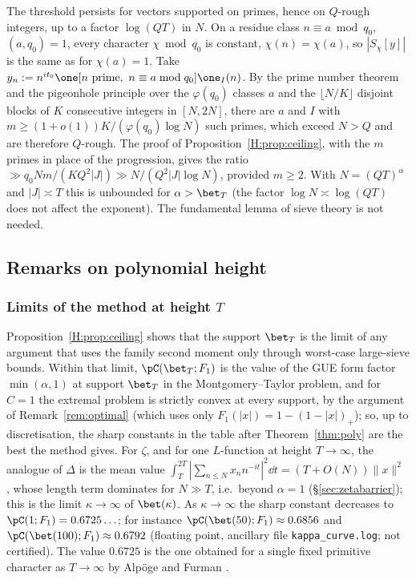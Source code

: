 \begin{remark}\label{H:rem:ceilingprimes}
The threshold persists for vectors supported on primes, hence on $Q$-rough integers, up to a factor $\log(QT)$ in $N$. On a residue class $n\equiv a\bmod q_0$, $(a,q_0)=1$, every character $\chi\bmod q_0$ is constant, $\chi(n)=\chi(a)$, so $|S_\chi[y]|$ is the same as for $\chi(a)=1$. Take $y_n:=n^{it_0}\one[n\text{ prime},\ n\equiv a\bmod q_0]\one_I(n)$. By the prime number theorem and the pigeonhole principle over the $\varphi(q_0)$ classes $a$ and the $\lfloor N/K\rfloor$ disjoint blocks of $K$ consecutive integers in $[N,2N]$, there are $a$ and $I$ with $m\ge(1+o(1))K/(\varphi(q_0)\log N)$ such primes, which exceed $N>Q$ and are therefore $Q$-rough. The proof of Proposition~\ref{H:prop:ceiling}, with the $m$ primes in place of the progression, gives the ratio $\gg q_0Nm/(KQ^2|J|)\gg N/(Q^2|J|\log N)$, provided $m\ge2$. With $N=(QT)^\alpha$ and $|J|\asymp T$ this is unbounded for $\alpha>\bet_T$ (the factor $\log N\asymp\log(QT)$ does not affect the exponent). The fundamental lemma of sieve theory is not needed.
\end{remark}

\subsection{Remarks on polynomial height}\label{H:sec:remarks}

\subsubsection*{Limits of the method at height $T$}
Proposition~\ref{H:prop:ceiling} shows that the support $\bet_T$ is the limit of any argument that uses the family second moment only through worst-case large-sieve bounds. Within that limit, $\pC(\bet_T;F_1)$ is the value of the GUE form factor $\min(\alpha,1)$ at support $\bet_T$ in the Montgomery--Taylor problem, and for $C=1$ the extremal problem is strictly convex at every support, by the argument of Remark~\ref{rem:optimal} (which uses only $F_1(|x|)=1-(1-|x|)_+$); so, up to discretisation, the sharp constants in the table after Theorem~\ref{thm:poly} are the best the method gives. For $\zeta$, and for one $L$-function at height $T\to\infty$, the analogue of $\Delta$ is the mean value $\int_T^{2T}|\sum_{n\le N}x_nn^{-it}|^2\dd t=(T+O(N))\|x\|^2$ \cite{MV74}, whose length term dominates for $N\gg T$, i.e.\ beyond $\alpha=1$ (\S\ref{sec:zetabarrier}); this is the limit $\kappa\to\infty$ of $\bet(\kappa)$. As $\kappa\to\infty$ the sharp constant decreases to $\pC(1;F_1)=0.6725\ldots$; for instance $\pC(\bet(50);F_1)\approx0.6856$ and $\pC(\bet(100);F_1)\approx0.6792$ (floating point, ancillary file \texttt{kappa\_curve.log}; not certified). The value $0.6725$ is the one obtained for a single fixed primitive character as $T\to\infty$ by Alp\"oge and Furman \cite[Theorem~B]{AF26}.

